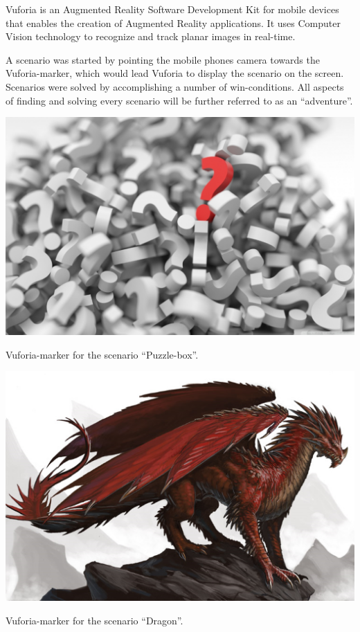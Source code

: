 \documentclass{sigchi-ext}
\begin{document}
Vuforia is an Augmented Reality Software Development Kit for mobile devices that enables the creation of Augmented Reality applications. It uses Computer Vision technology to recognize and track planar images in real-time. \cite{vuforiaExplanation}

A scenario was started by pointing the mobile phones camera towards the Vuforia-marker, which would lead Vuforia to display the scenario on the screen. Scenarios were solved by accomplishing a number of win-conditions. All aspects of finding and solving every scenario will be further referred to as an ``adventure''. 

\begin{marginfigure}[-15pc]
	\centering
	\begin{minipage}{\marginparwidth}
		\centering
		\includegraphics[width=1\marginparwidth]{figures/Vuforia_Questionmarks}
		\caption{Vuforia-marker for the scenario ``Puzzle-box''.}\label{fig:Vuforia_Questionmarks}
	\end{minipage}
	\begin{minipage}{\marginparwidth}
		\centering
		\includegraphics[width=1\marginparwidth]{figures/Vuforia_Dragon}
		\caption{Vuforia-marker for the scenario ``Dragon''.}\label{fig:Vuforia_Dragon}
	\end{minipage}
\end{marginfigure}
\end{document}
